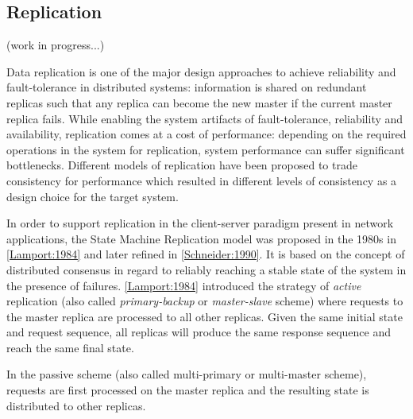 \subsection{Replication}
\label{sec:replication}

(work in progress...)

Data replication is one of the major design approaches to achieve reliability and fault-tolerance in distributed systems: information is shared on redundant replicas such that any replica can become the new master if the current master replica fails. While enabling the system artifacts of fault-tolerance, reliability and availability, replication comes at a cost of performance: depending on the required operations in the system for replication, system performance can suffer significant bottlenecks. Different models of replication have been proposed to trade consistency for performance which resulted in different levels of consistency as a design choice for the target system.

In order to support replication in the client-server paradigm present in network applications, the State Machine Replication model was proposed in the 1980s in \ref{Lamport:1984} and later refined in \ref{Schneider:1990}. It is based on the concept of distributed consensus in regard to reliably reaching a stable state of the system in the presence of failures. \ref{Lamport:1984} introduced the strategy of \textit{active} replication (also called \textit{primary-backup} or \textit{master-slave} scheme) where requests to the master replica are processed to all other replicas. Given the same initial state and request sequence, all replicas will produce the same response sequence and reach the same final state. 

In the passive scheme (also called multi-primary or multi-master scheme), requests are first processed on the master replica and the resulting state is distributed to other replicas.
